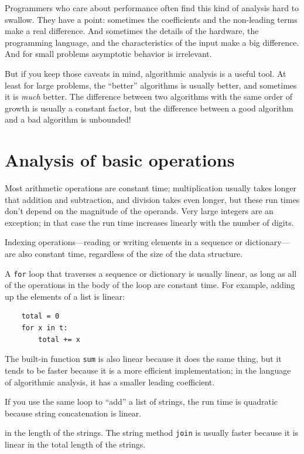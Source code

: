 \documentclass[10pt]{book}
\begin{document}
Programmers who care about performance often find this kind of
analysis hard to swallow.  They have a point: sometimes the
coefficients and the non-leading terms make a real difference.  And
sometimes the details of the hardware, the programming language, and
the characteristics of the input make a big difference.  And for small
problems asymptotic behavior is irrelevant.

But if you keep those caveats in mind, algorithmic analysis is a
useful tool.  At least for large problems, the ``better'' algorithms
is usually better, and sometimes it is {\em much} better.  The
difference between two algorithms with the same order of growth is
usually a constant factor, but the difference between a good algorithm
and a bad algorithm is unbounded!


\section{Analysis of basic operations}

Most arithmetic operations are constant time; multiplication
usually takes longer that addition and subtraction, and division
takes even longer, but these run times don't
depend on the magnitude of the operands.  Very large integers
are an exception; in that case the run time increases linearly
with the number of digits.

Indexing operations---reading or writing elements in a sequence
or dictionary---are also constant time, regardless of the size
of the data structure.

A {\tt for} loop that traverses a sequence or dictionary is
usually linear, as long as all of the operations in the body
of the loop are constant time.  For example, adding up the
elements of a list is linear:

\begin{verbatim}
    total = 0
    for x in t:
        total += x
\end{verbatim}

The built-in function {\tt sum} is also linear because it does
the same thing, but it tends to be faster because it is a more
efficient implementation; in the language of algorithmic analysis,
it has a smaller leading coefficient.

If you use the same loop to ``add'' a list of strings, the
run time is quadratic
because string concatenation is linear.


 in the length of the strings.
The string method {\tt join} is usually faster because it is
linear in the total length of the strings.
\end{document}
